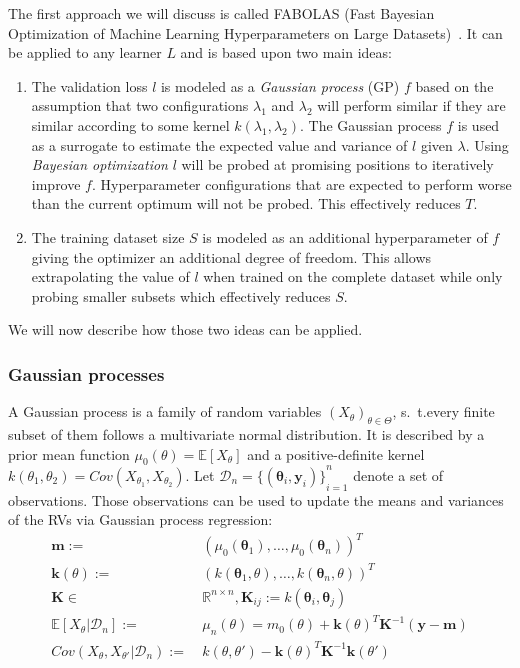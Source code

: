 The first approach we will discuss is called FABOLAS (Fast Bayesian Optimization of Machine Learning Hyperparameters on Large Datasets)~\cite{Klein2016}.
It can be applied to any learner \(L\) and is based upon two main ideas:
\begin{enumerate}
	\item The validation loss \(l\) is modeled as a \textit{Gaussian process} (GP) \(f\) based on the assumption that two configurations \(\lambda_1\) and \(\lambda_2\) will perform similar if they are similar according to some kernel \(k(\lambda_1, \lambda_2)\).
		The Gaussian process \(f\) is used as a surrogate to estimate the expected value and variance of \(l\) given \(\lambda\).
		Using \textit{Bayesian optimization} \(l\) will be probed at promising positions to iteratively improve \(f\).
		Hyperparameter configurations that are expected to perform worse than the current optimum will not be probed.
		This effectively reduces \(T\).
	\item The training dataset size \(S\) is modeled as an additional hyperparameter of \(f\) giving the optimizer an additional degree of freedom.
		This allows extrapolating the value of \(l\) when trained on the complete dataset while only probing smaller subsets
		which effectively reduces \(S\).
\end{enumerate}
We will now describe how those two ideas can be applied.

\subsubsection{Gaussian processes}%
\label{sec:hyperparams:fabolas:gaussian}

A Gaussian process is a family of random variables \({(X_\theta)}_{\theta \in \Theta}\), s.~t.\@ every finite subset of them follows a multivariate normal distribution.
It is described by a prior mean function \(\mu_0(\theta) = \mathbb{E}[X_\theta]\) and a positive-definite kernel \(k(\theta_1, \theta_2) = \mathit{Cov}(X_{\theta_1}, X_{\theta_2})\).
Let \(\mathcal{D}_n = {\{(\bm{\theta}_i, \bm{y}_i)\}}_{i = 1}^{n}\) denote a set of observations.
Those observations can be used to update the means and variances of the RVs via Gaussian process regression:
\begin{align}
	\bm{m} :=&\ {(\mu_0(\bm{\theta}_1), \dots, \mu_0(\bm{\theta}_n))}^T \nonumber \\
	\bm{k}(\theta) :=&\ {(k(\bm{\theta}_1, \theta), \dots, k(\bm{\theta}_n, \theta))}^T \nonumber \\
	\bm{K} \in&\ \mathbb{R}^{n \times n}, \bm{K}_{ij} := k(\bm{\theta}_i, \bm{\theta}_j) \nonumber \\
	\mathbb{E}[X_\theta | \mathcal{D}_n] :=&\ \mu_n(\theta) = m_0(\theta) + \bm{k}{(\theta)}^T \bm{K}^{-1} (\bm{y} - \bm{m}) \\
	\mathit{Cov}(X_\theta, X_{\theta'} | \mathcal{D}_n) :=&\ k(\theta, \theta') - \bm{k}{(\theta)}^T \bm{K}^{-1} \bm{k}(\theta')
\end{align}

